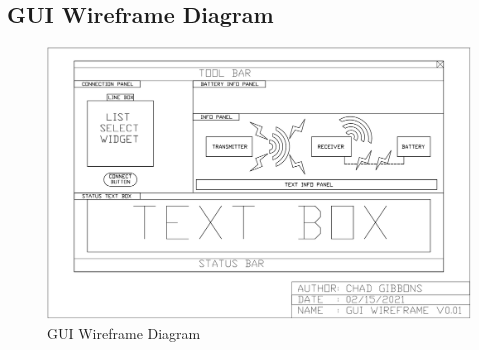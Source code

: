 \documentclass[12pt]{article}
\begin{document}
\begin{appendices}
\section{GUI Wireframe Diagram}
\hfill
\begin{figure}[h!]
\centering
\includegraphics[angle=90,width=0.74\linewidth]{gui_wireframe}
\caption{GUI Wireframe Diagram}
\end{figure}
\hfill


\end{appendices}












\end{document}
